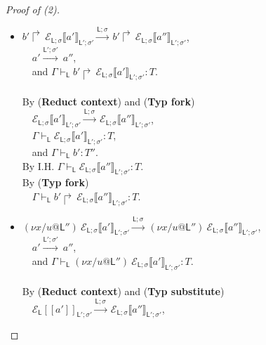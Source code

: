 \documentclass{sigplanconf}
\newcommand{\lab}{\mathsf L}
\newcommand{\new}[2]{(\nu #1)\:#2}
\newcommand{\action}[1]{\stackrel{#1}{\longrightarrow}~}
\newcommand{\fork}[2]{#1\Rsh\:\!#2}
\newcommand{\lctx}[2]{\mathcal E_\lab[\![#1]\!]_{#2}}
\newcommand{\sctx}[2]{\mathcal E_{\lab;\sigma}\llbracket#1\rrbracket_{#2}}
\newcommand{\trule}[1]{(\textbf{Typ #1})}
\newcommand{\rrule}[1]{\textbf{Reduct #1}}
\begin{document}
\begin{proof}[Proof of (2)]
\begin{itemize}
$~~~$ $a' \action{\lab';\sigma'} a''$,\\
$~~~$ and $\Gamma \vdash_\lab \fork {\sctx{a'}{\lab';\sigma'}} b' : T$.\\
\\
By (\rrule{context}) and \trule{fork} \\
$~~~$ $\sctx{a'}{\lab';\sigma'} \action{\lab;\sigma} \sctx{a''}{\lab';\sigma'}$,\\
$~~~$ $\Gamma \vdash_\lab \sctx{a'}{\lab';\sigma'} : T''$, \\
$~~~$ and $\Gamma \vdash_\lab b' : T$.\\
By I.H. $\Gamma \vdash_\lab \sctx{a''}{\lab';\sigma'} : T''$.\\
By \trule{fork} \\
$~~~$ $\Gamma \vdash_\lab \fork {\sctx{a''}{\lab';\sigma'}} b' : T$.\\
\item $\fork {b'}{\sctx{a'}{\lab';\sigma'}} \action{\lab;\sigma} \fork {b'} {\sctx{a''}{\lab';\sigma'}}$,\\
$~~~$ $a' \action{\lab';\sigma'} a''$,\\
$~~~$ and $\Gamma \vdash_\lab \fork {b'}{\sctx{a'}{\lab';\sigma'}} : T$.\\
\\
By (\rrule{context}) and \trule{fork} \\
$~~~$ $\sctx{a'}{\lab';\sigma'} \action{\lab;\sigma} \sctx{a''}{\lab';\sigma'}$,\\
$~~~$ $\Gamma \vdash_\lab \sctx{a'}{\lab';\sigma'} : T$, \\
$~~~$ and $\Gamma \vdash_\lab b' : T''$.\\
By I.H. $\Gamma \vdash_\lab \sctx{a''}{\lab';\sigma'} : T$.\\
By \trule{fork} \\
$~~~$ $\Gamma \vdash_\lab \fork {b'}{\sctx{a''}{\lab';\sigma'}} : T$.\\
\item $\new{x/u@\lab''}{\sctx{a'}{\lab';\sigma'}} \action{\lab;\sigma} \new{x/u@\lab''}{\sctx{a''}{\lab';\sigma'}}$,\\
$~~~$ $a' \action{\lab';\sigma'} a''$,\\
$~~~$ and $\Gamma \vdash_\lab \new{x/u@\lab''}{\sctx{a'}{\lab';\sigma'}} : T$.\\
\\
By (\rrule{context}) and \trule{substitute} \\
$~~~$ $\lctx{a'}{\lab';\sigma'} \action{\lab;\sigma} \sctx{a''}{\lab';\sigma'}$,\\

\end{itemize}
\end{proof}
\end{document}

